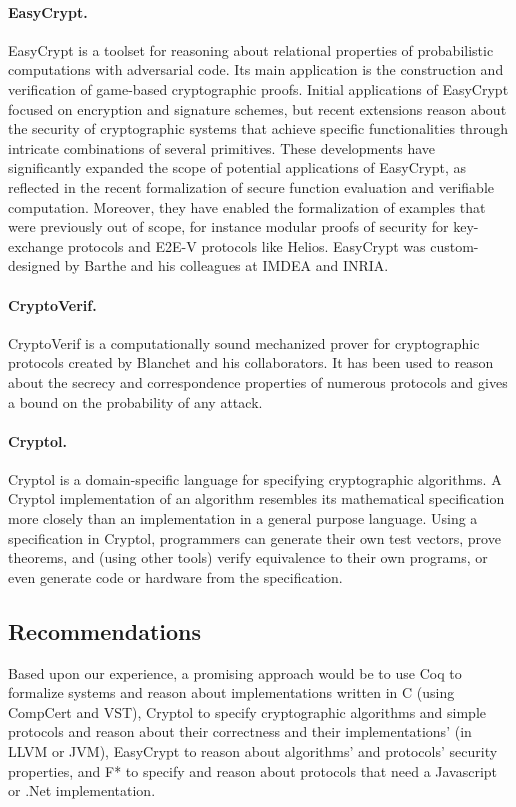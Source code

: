 \paragraph{EasyCrypt.} EasyCrypt is a toolset for reasoning about
relational properties of probabilistic computations with adversarial
code. Its main application is the construction and verification of
game-based cryptographic proofs. Initial applications of EasyCrypt
focused on encryption and signature schemes, but recent extensions
reason about the security of cryptographic systems that achieve
specific functionalities through intricate combinations of several
primitives. These developments have significantly expanded the scope
of potential applications of EasyCrypt, as reflected in the recent
formalization of secure function evaluation and verifiable
computation. Moreover, they have enabled the formalization of examples
that were previously out of scope, for instance modular proofs of
security for key-exchange protocols and E2E-V protocols like Helios.
EasyCrypt was custom-designed by Barthe and his colleagues at IMDEA
and INRIA.

\paragraph{CryptoVerif.} CryptoVerif is a computationally sound
mechanized prover for cryptographic protocols created by Blanchet and
his collaborators. It has been used to reason about the secrecy and
correspondence properties of numerous protocols and gives a bound on
the probability of any attack.

\paragraph{Cryptol.} Cryptol is a domain-specific language for
specifying cryptographic algorithms. A Cryptol implementation of an
algorithm resembles its mathematical specification more closely than
an implementation in a general purpose language. Using a specification
in Cryptol, programmers can generate their own test vectors, prove
theorems, and (using other tools) verify equivalence to their own
programs, or even generate code or hardware from the specification.

\subsection{Recommendations}

Based upon our experience, a promising approach would be to use Coq to
formalize systems and reason about implementations written in C (using
CompCert and VST), Cryptol to specify cryptographic algorithms and
simple protocols and reason about their correctness and their
implementations' (in LLVM or JVM), EasyCrypt to reason about
algorithms' and protocols' security properties, and F* to specify and
reason about protocols that need a Javascript or .Net implementation.

